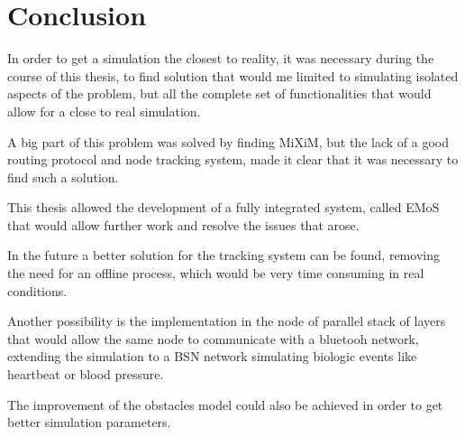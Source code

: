 
\section{Conclusion}
In order to get a simulation the closest to reality, it was necessary during the course of this thesis, to find solution that would me limited to simulating isolated aspects of the problem, but all the complete set of functionalities that would allow for a close to real simulation.

A big part of this problem was solved by finding MiXiM, but the lack of a good routing protocol and node tracking system, made it clear that it was necessary to find such a solution. 

This thesis allowed the development of a fully integrated system, called EMoS that would allow further work and resolve the issues that arose.

In the future a better solution for the tracking system can be found, removing the need for an offline process, which would be very time consuming in real conditions.

Another possibility is the implementation in the node of parallel stack of layers that would allow the same node to communicate with a bluetooh network, extending the simulation to a BSN network simulating biologic events like heartbeat or blood pressure.

The improvement of the obstacles model could also be achieved in order to get better simulation parameters.


%


